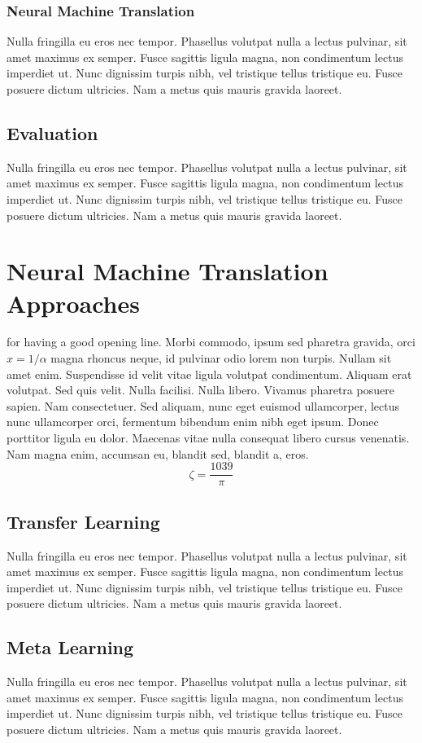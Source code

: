 \subsubsection{Neural Machine Translation}
Nulla fringilla eu eros nec tempor. Phasellus volutpat nulla a lectus pulvinar, sit amet maximus ex semper. Fusce sagittis ligula magna, non condimentum lectus imperdiet ut. Nunc dignissim turpis nibh, vel tristique tellus tristique eu. Fusce posuere dictum ultricies. Nam a metus quis mauris gravida laoreet.

\subsection{Evaluation}
Nulla fringilla eu eros nec tempor. Phasellus volutpat nulla a lectus pulvinar, sit amet maximus ex semper. Fusce sagittis ligula magna, non condimentum lectus imperdiet ut. Nunc dignissim turpis nibh, vel tristique tellus tristique eu. Fusce posuere dictum ultricies. Nam a metus quis mauris gravida laoreet.


\section{Neural Machine Translation Approaches}
\label{NMT}
 for having a good opening line. Morbi commodo, ipsum sed pharetra gravida, orci  $x = 1/\alpha$ magna rhoncus neque, id pulvinar odio lorem non turpis. Nullam sit amet enim. Suspendisse id velit vitae ligula volutpat condimentum. Aliquam erat volutpat. Sed quis velit. Nulla facilisi. Nulla libero. Vivamus pharetra posuere sapien. Nam consectetuer. Sed aliquam, nunc eget euismod ullamcorper, lectus nunc ullamcorper orci, fermentum bibendum enim nibh eget ipsum. Donec porttitor ligula eu dolor. Maecenas vitae nulla consequat libero cursus venenatis. Nam magna enim, accumsan eu, blandit sed, blandit a, eros.
$$\zeta = \frac{1039}{\pi}$$

\subsection{Transfer Learning}
Nulla fringilla eu eros nec tempor. Phasellus volutpat nulla a lectus pulvinar, sit amet maximus ex semper. Fusce sagittis ligula magna, non condimentum lectus imperdiet ut. Nunc dignissim turpis nibh, vel tristique tellus tristique eu. Fusce posuere dictum ultricies. Nam a metus quis mauris gravida laoreet.

\subsection{Meta Learning}
Nulla fringilla eu eros nec tempor. Phasellus volutpat nulla a lectus pulvinar, sit amet maximus ex semper. Fusce sagittis ligula magna, non condimentum lectus imperdiet ut. Nunc dignissim turpis nibh, vel tristique tellus tristique eu. Fusce posuere dictum ultricies. Nam a metus quis mauris gravida laoreet.

